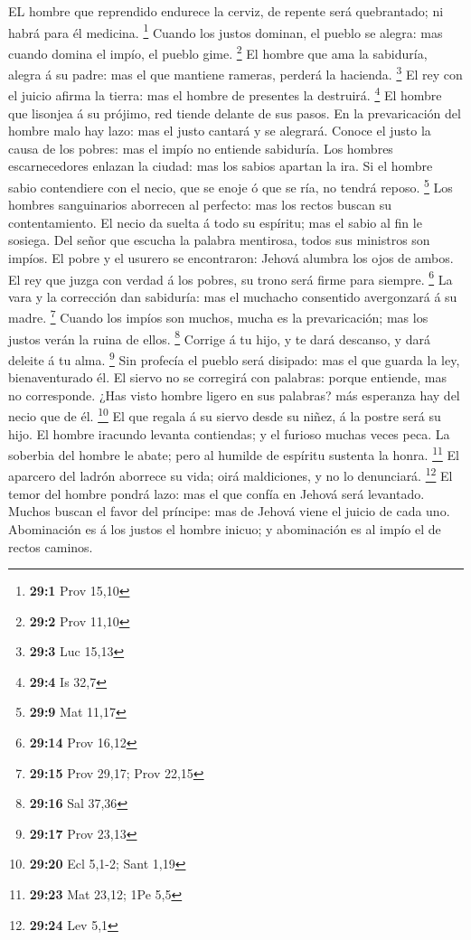  EL hombre que reprendido endurece la cerviz, de repente
será quebrantado; ni habrá para él medicina. \footnote{\textbf{29:1}
  Prov 15,10}  Cuando los justos dominan, el pueblo se
alegra: mas cuando domina el impío, el pueblo gime. \footnote{\textbf{29:2}
  Prov 11,10}  El hombre que ama la sabiduría, alegra á su
padre: mas el que mantiene rameras, perderá la hacienda. \footnote{\textbf{29:3}
  Luc 15,13}  El rey con el juicio afirma la tierra: mas el
hombre de presentes la destruirá. \footnote{\textbf{29:4} Is 32,7}
 El hombre que lisonjea á su prójimo, red tiende delante de
sus pasos.  En la prevaricación del hombre malo hay lazo:
mas el justo cantará y se alegrará.  Conoce el justo la
causa de los pobres: mas el impío no entiende sabiduría. 
Los hombres escarnecedores enlazan la ciudad: mas los sabios apartan la
ira.  Si el hombre sabio contendiere con el necio, que se
enoje ó que se ría, no tendrá reposo. \footnote{\textbf{29:9} Mat 11,17}
 Los hombres sanguinarios aborrecen al perfecto: mas los
rectos buscan su contentamiento.  El necio da suelta á todo
su espíritu; mas el sabio al fin le sosiega.  Del señor que
escucha la palabra mentirosa, todos sus ministros son impíos.
 El pobre y el usurero se encontraron: Jehová alumbra los
ojos de ambos.  El rey que juzga con verdad á los pobres,
su trono será firme para siempre. \footnote{\textbf{29:14} Prov 16,12}
 La vara y la corrección dan sabiduría: mas el muchacho
consentido avergonzará á su madre. \footnote{\textbf{29:15} Prov 29,17;
  Prov 22,15}  Cuando los impíos son muchos, mucha es la
prevaricación; mas los justos verán la ruina de ellos. \footnote{\textbf{29:16}
  Sal 37,36}  Corrige á tu hijo, y te dará descanso, y dará
deleite á tu alma. \footnote{\textbf{29:17} Prov 23,13} 
Sin profecía el pueblo será disipado: mas el que guarda la ley,
bienaventurado él.  El siervo no se corregirá con palabras:
porque entiende, mas no corresponde.  ¿Has visto hombre
ligero en sus palabras? más esperanza hay del necio que de él.
\footnote{\textbf{29:20} Ecl 5,1-2; Sant 1,19}  El que
regala á su siervo desde su niñez, á la postre será su hijo.
 El hombre iracundo levanta contiendas; y el furioso muchas
veces peca.  La soberbia del hombre le abate; pero al
humilde de espíritu sustenta la honra. \footnote{\textbf{29:23} Mat
  23,12; 1Pe 5,5}  El aparcero del ladrón aborrece su vida;
oirá maldiciones, y no lo denunciará. \footnote{\textbf{29:24} Lev 5,1}
 El temor del hombre pondrá lazo: mas el que confía en
Jehová será levantado.  Muchos buscan el favor del
príncipe: mas de Jehová viene el juicio de cada uno. 
Abominación es á los justos el hombre inicuo; y abominación es al impío
el de rectos caminos.


